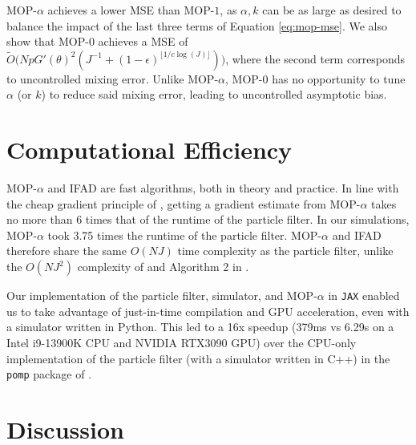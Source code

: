 \documentclass[numsec,webpdf,modern,medium,namedate]{oup-authoring-template}
\newcommand\arxiv[2]{#2} %
\theoremstyle{thmstyleone}%
\theoremstyle{thmstyletwo}%
\theoremstyle{thmstylethree}%
\begin{document}
MOP-$\alpha$ achieves a lower MSE than MOP-$1$, as $\alpha, k$ can be as large as desired to balance the impact of the last three terms of Equation \ref{eq:mop-mse}. We also show that MOP-$0$ achieves a MSE of $\tilde{O}\big(NpG'(\theta)^2(J^{-1}+(1-\epsilon)^{\lfloor1/c\log(J)\rfloor})\big)$, where the second term corresponds to uncontrolled mixing error. Unlike MOP-$\alpha$, MOP-$0$ has no opportunity to tune $\alpha$ (or $k$) to reduce said mixing error, leading to uncontrolled asymptotic bias. 


\arxiv{}{\vspace*{-2mm}}
\section{Computational Efficiency}

MOP-$\alpha$ and IFAD are fast algorithms, both in theory and practice. 
In line with the cheap gradient principle of \cite{kakade2019provably}, getting a gradient estimate from MOP-$\alpha$ takes no more than 6 times that of the runtime of the particle filter. In our simulations, MOP-$\alpha$ took 3.75 times the runtime of the particle filter. 
MOP-$\alpha$ and IFAD therefore share the same $O(NJ)$ time complexity as the particle filter, unlike the $O(NJ^2)$ complexity of \cite{corenflos21} and Algorithm 2 in \citep{poyiadjis11, scibior21}.



Our implementation of the particle filter, simulator, and MOP-$\alpha$ in \texttt{JAX} \cite{jax} enabled us to take advantage of just-in-time compilation and GPU acceleration, even with a simulator written in Python. This led to a 16x speedup (379ms vs 6.29s on a Intel i9-13900K CPU and NVIDIA RTX3090 GPU) over the CPU-only implementation of the particle filter (with a simulator written in C++) in the \texttt{pomp} package of \cite{king16}. 





\arxiv{}{\vspace*{-2mm}}
\section{Discussion}
\end{document}
